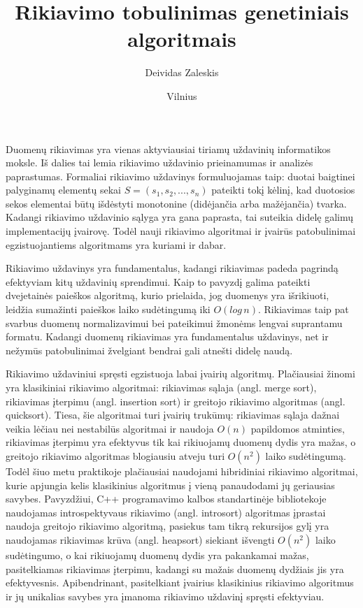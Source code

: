 \documentclass{VUMIFInfBakalaurinis}
\institute{Informatikos institutas}
\title{Rikiavimo tobulinimas genetiniais algoritmais}
\author{Deividas Zaleskis}
\date{Vilnius \\ \the\year}
\begin{document}
\maketitle

\tableofcontents


Duomenų rikiavimas yra vienas aktyviausiai tiriamų uždavinių informatikos moksle.
Iš dalies tai lemia rikiavimo uždavinio prieinamumas ir analizės paprastumas.
Formaliai rikiavimo uždavinys formuluojamas taip:
duotai baigtinei palyginamų elementų sekai $S = (s_1, s_2, ..., s_n)$ pateikti tokį
kėlinį, kad duotosios sekos elementai būtų išdėstyti monotonine (didėjančia arba mažėjančia) tvarka.
Kadangi rikiavimo uždavinio sąlyga yra gana paprasta, tai suteikia didelę galimų implementacijų įvairovę.
Todėl nauji rikiavimo algoritmai ir įvairūs patobulinimai egzistuojantiems algoritmams yra kuriami ir dabar.

Rikiavimo uždavinys yra fundamentalus, kadangi rikiavimas padeda pagrindą efektyviam kitų uždavinių sprendimui.
Kaip to pavyzdį galima pateikti dvejetainės paieškos algoritmą, kurio prielaida,
jog duomenys yra išrikiuoti, leidžia sumažinti paieškos laiko sudėtingumą iki $O(log\,n)$.
Rikiavimas taip pat svarbus duomenų normalizavimui bei pateikimui žmonėms lengvai suprantamu formatu.
Kadangi duomenų rikiavimas yra fundamentalus uždavinys, net ir nežymūs patobulinimai žvelgiant bendrai
gali atnešti didelę naudą.

Rikiavimo uždaviniui spręsti egzistuoja labai įvairių algoritmų.
Plačiausiai žinomi yra klasikiniai rikiavimo algoritmai: rikiavimas sąlaja (angl. merge sort), rikiavimas įterpimu (angl. insertion sort) ir greitojo rikiavimo algoritmas (angl. quicksort).
Tiesa, šie algoritmai turi įvairių trukūmų:
rikiavimas sąlaja dažnai veikia lėčiau nei nestabilūs algoritmai ir naudoja $O(n)$ papildomos atminties, rikiavimas įterpimu yra efektyvus tik kai rikiuojamų duomenų dydis yra mažas, o
greitojo rikiavimo algoritmas blogiausiu atveju turi $O(n^2)$ laiko sudėtingumą.
Todėl šiuo metu praktikoje plačiausiai naudojami hibridiniai rikiavimo algoritmai, kurie apjungia kelis klasikinius algoritmus į vieną panaudodami jų geriausias savybes.
Pavyzdžiui, C++ programavimo kalbos standartinėje bibliotekoje naudojamas introspektyvaus rikiavimo (angl. introsort) algoritmas įprastai naudoja greitojo rikiavimo algoritmą,
pasiekus tam tikrą rekursijos gylį yra naudojamas rikiavimas krūva (angl. heapsort) siekiant išvengti $O(n^2)$ laiko sudėtingumo,
o kai rikiuojamų duomenų dydis yra pakankamai mažas, pasitelkiamas rikiavimas įterpimu, kadangi su mažais duomenų dydžiais jis yra efektyvesnis.
Apibendrinant, pasitelkiant įvairius klasikinius rikiavimo algoritmus ir jų unikalias savybes yra įmanoma rikiavimo uždavinį spręsti efektyviau.
\end{document}
